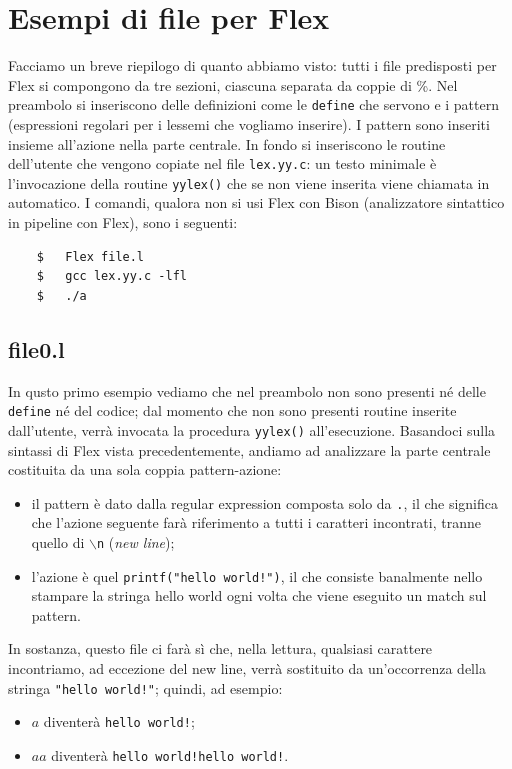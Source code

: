 \documentclass[class=book, crop=false, oneside, 12pt]{standalone}
\begin{document}
\section{Esempi di file per Flex}
Facciamo un breve riepilogo di quanto abbiamo visto: tutti i file predisposti per Flex si compongono da tre sezioni, ciascuna separata da coppie di \%. Nel preambolo si inseriscono delle definizioni come le \texttt{define} che servono e i pattern (espressioni regolari per i lessemi che vogliamo inserire). I pattern sono inseriti insieme all'azione nella parte centrale. In fondo si inseriscono le routine dell'utente che vengono copiate nel file \texttt{lex.yy.c}: un testo minimale è l'invocazione della routine \texttt{yylex()} che se non viene inserita viene chiamata in automatico. I comandi, qualora non si usi Flex con Bison (analizzatore sintattico in pipeline con Flex), sono i seguenti:
\begin{verbatim}
    $   Flex file.l
    $   gcc lex.yy.c -lfl
    $   ./a
\end{verbatim}

\subsection*{file0.l}

In qusto primo esempio vediamo che nel preambolo non sono presenti né delle \texttt{define} né del codice; dal momento che non sono presenti routine inserite dall'utente, verrà invocata la procedura \texttt{yylex()} all'esecuzione. Basandoci sulla sintassi di Flex vista precedentemente, andiamo ad analizzare la parte centrale costituita da una sola coppia pattern-azione:
\begin{itemize}
    \item il pattern è dato dalla regular expression composta solo da \texttt{.}, il che significa che l'azione seguente farà riferimento a tutti i caratteri incontrati, tranne quello di \texttt{\(\backslash\)n} (\emph{new line});
    \item l'azione è quel \texttt{printf("hello world!")}, il che consiste banalmente nello stampare la stringa hello world ogni volta che viene eseguito un match sul pattern.
\end{itemize}
In sostanza, questo file ci farà sì che, nella lettura, qualsiasi carattere incontriamo, ad eccezione del new line, verrà sostituito da un'occorrenza della stringa \texttt{"hello world!"}; quindi, ad esempio:
\begin{itemize}
    \item \(a\) diventerà \texttt{hello world!};
    \item \(aa\) diventerà \texttt{hello world!hello world!}.
\end{itemize}
\end{document}
